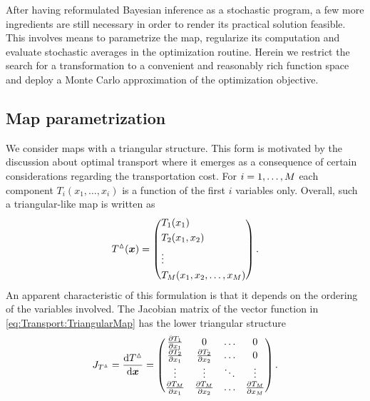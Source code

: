 After having reformulated Bayesian inference as a stochastic program, a few more ingredients are still necessary in order to render its practical solution feasible.
This involves means to parametrize the map, regularize its computation and evaluate stochastic averages in the optimization routine.
Herein we restrict the search for a transformation to a convenient and reasonably rich function space and deploy a Monte Carlo approximation of the optimization objective.

\subsection{Map parametrization}
We consider maps with a triangular structure.
This form is motivated by the discussion about optimal transport where it emerges as a consequence of certain considerations regarding the transportation cost.
For \(i=1,\ldots,M\) each component \(T_i(x_1,\ldots,x_i)\) is a function of the first \(i\) variables only.
Overall, such a triangular-like map is written as
\begin{equation} \label{eq:Transport:TriangularMap}
  T^\vartriangle(\bm{x})
  = \left(
    \begin{aligned}
      & T_1(x_1) \\
      & T_2(x_1,x_2) \\
      & \vdots \\
      & T_M(x_1,x_2,\ldots,x_M)
    \end{aligned}
    \right).
\end{equation}
An apparent characteristic of this formulation is that it depends on the ordering of the variables involved.
The Jacobian matrix of the vector function in \cref{eq:Transport:TriangularMap} has the lower triangular structure
\begin{equation} \label{eq:Transport:TriangularJacobianMatrix}
  J_{T^\vartriangle} = \frac{\mathrm{d} T^\vartriangle}{\mathrm{d} \bm{x}}
  = \begin{pmatrix}
      \frac{\partial T_1}{\partial x_1} & 0 & \ldots & 0 \\
      \frac{\partial T_2}{\partial x_1} & \frac{\partial T_2}{\partial x_2} & \ldots & 0 \\
      \vdots & \vdots & \ddots & \vdots \\
      \frac{\partial T_M}{\partial x_1} & \frac{\partial T_M}{\partial x_2} & \ldots & \frac{\partial T_M}{\partial x_M} \\
    \end{pmatrix}.
\end{equation}
